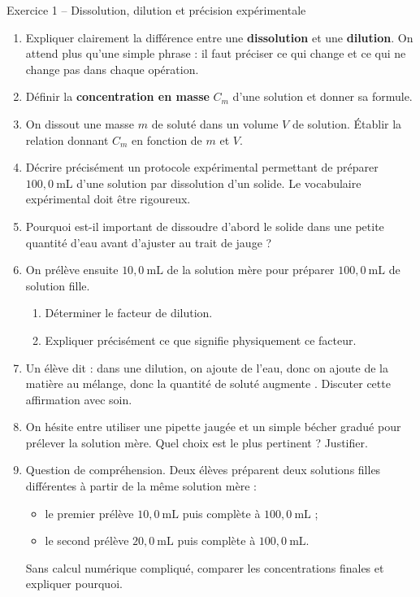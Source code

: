 \documentclass[11pt,a4paper]{article}
\begin{document}
\begin{exobox}{Exercice 1 -- Dissolution, dilution et précision expérimentale}
\begin{center}
\begin{tikzpicture}[scale=1]
\end{tikzpicture}
\end{center}

\begin{enumerate}[label=\textbf{\arabic*.}]
    \item Expliquer clairement la différence entre une \textbf{dissolution} et une \textbf{dilution}. On attend plus qu’une simple phrase : il faut préciser ce qui change et ce qui ne change pas dans chaque opération.
    
    \item Définir la \textbf{concentration en masse} \(C_m\) d’une solution et donner sa formule.

    \item On dissout une masse \(m\) de soluté dans un volume \(V\) de solution. Établir la relation donnant \(C_m\) en fonction de \(m\) et \(V\).

    \item Décrire précisément un protocole expérimental permettant de préparer \(100,0~\mathrm{mL}\) d’une solution par dissolution d’un solide. Le vocabulaire expérimental doit être rigoureux.

    \item Pourquoi est-il important de dissoudre d’abord le solide dans une petite quantité d’eau avant d’ajuster au trait de jauge ?

    \item On prélève ensuite \(10,0~\mathrm{mL}\) de la solution mère pour préparer \(100,0~\mathrm{mL}\) de solution fille.
    \begin{enumerate}[label=\alph*)]
        \item Déterminer le facteur de dilution.
        \item Expliquer précisément ce que signifie physiquement ce facteur.
    \end{enumerate}

    \item Un élève dit : \og dans une dilution, on ajoute de l’eau, donc on ajoute de la matière au mélange, donc la quantité de soluté augmente \fg.  
    Discuter cette affirmation avec soin.

    \item On hésite entre utiliser une pipette jaugée et un simple bécher gradué pour prélever la solution mère. Quel choix est le plus pertinent ? Justifier.

    \item Question de compréhension.  
    Deux élèves préparent deux solutions filles différentes à partir de la même solution mère :
    \begin{itemize}
        \item le premier prélève \(10,0~\mathrm{mL}\) puis complète à \(100,0~\mathrm{mL}\) ;
        \item le second prélève \(20,0~\mathrm{mL}\) puis complète à \(100,0~\mathrm{mL}\).
    \end{itemize}
    Sans calcul numérique compliqué, comparer les concentrations finales et expliquer pourquoi.


\end{enumerate}
\end{exobox}
\end{document}
